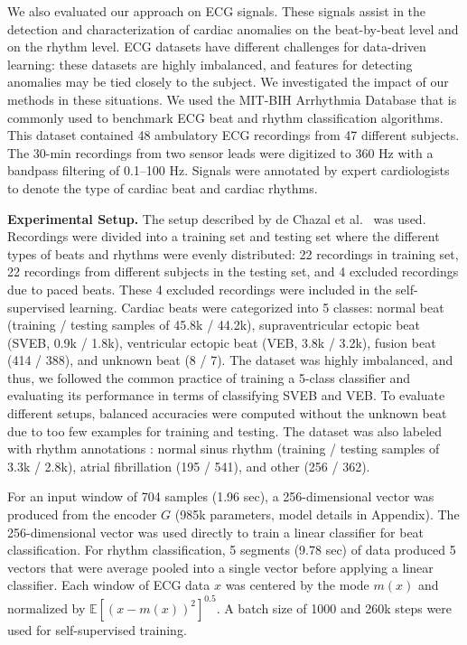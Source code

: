 \documentclass{article}
\renewcommand{\paragraph}[1]{\textbf{#1}\hspace{1em}}
\begin{document}
We also evaluated our approach on ECG signals. These signals assist in the
detection and characterization of cardiac anomalies on the beat-by-beat level
and on the rhythm level. ECG datasets have different challenges for data-driven
learning: these datasets are highly imbalanced, and features for detecting
anomalies may be tied closely to the subject. We investigated the impact of our
methods in these situations. We used the MIT-BIH Arrhythmia Database
\cite{goldberger_physiobank_2000, moody_impact_2001,physionet_ecg_url} that is
commonly used to benchmark ECG beat and rhythm classification algorithms. This
dataset contained 48 ambulatory ECG recordings from 47 different subjects. The
30-min recordings from two sensor leads were digitized to 360 Hz with a bandpass
filtering of 0.1--100 Hz. Signals were annotated by expert cardiologists to
denote the type of cardiac beat and cardiac rhythms.


\paragraph{Experimental Setup.}
The setup described by de Chazal et al.~\cite{de_chazal_automatic_2004} was
used. Recordings were divided into a training set and testing set where the
different types of beats and rhythms were evenly distributed: 22 recordings in
training set, 22 recordings from different subjects in the testing set, and 4
excluded recordings due to paced beats. These 4 excluded recordings were
included in the self-supervised learning. Cardiac beats were categorized into 5
classes: normal beat (training / testing samples of 45.8k / 44.2k),
supraventricular ectopic beat (SVEB, 0.9k / 1.8k), ventricular ectopic beat
(VEB, 3.8k / 3.2k), fusion beat (414 / 388), and unknown beat (8 / 7). The
dataset was highly imbalanced, and thus, we followed the common practice of
training a 5-class classifier and evaluating its performance in terms of
classifying SVEB and VEB. To evaluate different setups, balanced accuracies were
computed without the unknown beat due to too few examples for training and
testing. The dataset was also labeled with rhythm annotations
\cite{dash_automatic_2009,bruun_automatic_2017,wu_deep_2019}: normal sinus
rhythm (training / testing samples of 3.3k / 2.8k), atrial fibrillation (195 /
541), and other (256 / 362).

For an input window of 704 samples (1.96 sec), a 256-dimensional vector was
produced from the encoder $G$ (985k parameters, model details in Appendix). The
256-dimensional vector was used directly to train a linear classifier for beat
classification. For rhythm classification, 5 segments (9.78 sec) of data
produced 5 vectors that were average pooled into a single vector before applying
a linear classifier. Each window of ECG data $x$ was centered by the mode $m(x)$
and normalized by $\mathbb{E}[(x - m(x))^2]^{0.5}$. A batch size of
1000 and 260k steps were used for self-supervised training.
\end{document}
